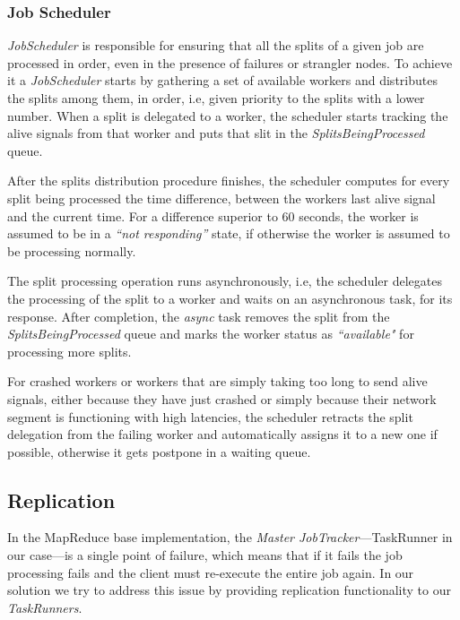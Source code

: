 \documentclass[times, 10pt,twocolumn]{article}
\begin{document}
        	\subsubsection{Job Scheduler}\label{job-scheduler}
            
            \textit{JobScheduler} is responsible for ensuring that all the splits of a given job are processed in order, even in the presence of failures or strangler nodes. To achieve it a \textit{JobScheduler} starts by gathering a set of available workers and distributes the splits among them, in order, i.e, given priority to the splits with a lower number. When a split is delegated to a worker, the scheduler starts tracking the alive signals from that worker and puts that slit in the \textit{SplitsBeingProcessed} queue.
            
            After the splits distribution procedure finishes, the scheduler computes for every split being processed the time difference, between the workers last alive signal and the current time. For a difference superior to 60 seconds, the worker is assumed to be in a \textit{``not responding''} state, if otherwise the worker is assumed to be processing normally.
            
            The split processing operation runs asynchronously, i.e, the scheduler delegates the processing of the split to a worker and waits on an asynchronous task, for its response. After completion, the \textit{async} task removes the split from the \textit{SplitsBeingProcessed} queue and marks the worker status as \textit{``available"} for processing more splits.
            
            For crashed workers or workers that are simply taking too long to send alive signals, either because they have just crashed or simply because their network segment is functioning with high latencies, the scheduler retracts the split delegation from the failing worker and automatically assigns it to a new one if possible, otherwise it gets postpone in a waiting queue.
            
        \subsection{Replication}
        
            In the MapReduce base implementation, the \textit{Master JobTracker}—TaskRunner in our case—is a single point of failure, which means that if it fails the job processing fails and the client must re-execute the entire job again. In our solution we try to address this issue by providing replication functionality to our \textit{TaskRunners}. 
            
\end{document}
